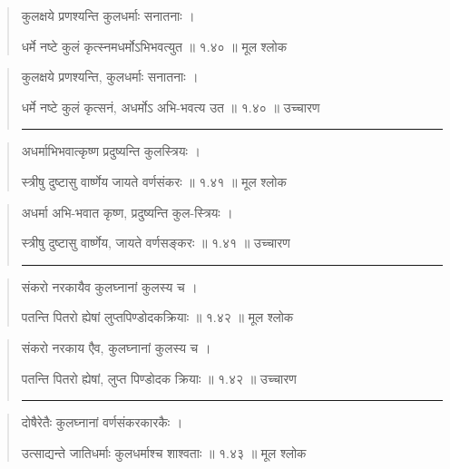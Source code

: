 \begin{quotation} 

कुलक्षये प्रणश्यन्ति कुलधर्माः सनातनाः  ।  


धर्मे नष्टे कुलं कृत्स्नमधर्मोऽभिभवत्युत  ॥ १.४० ॥  मूल श्लोक
\end{quotation}

\begin{quotation}

कुलक्षये प्रणश्यन्ति, कुलधर्माः सनातनाः  ।  


धर्मे नष्टे कुलं कृत्सनं, अधर्मोऽ अभि-भवत्य उत  ॥ १.४० ॥  उच्चारण

\noindent\rule{16cm}{0.4pt} 
\end{quotation}


\begin{quotation} 

अधर्माभिभवात्कृष्ण प्रदुष्यन्ति कुलस्त्रियः  ।  


स्त्रीषु दुष्टासु वार्ष्णेय जायते वर्णसंकरः  ॥ १.४१ ॥  मूल श्लोक
\end{quotation}

\begin{quotation}

अधर्मा अभि-भवात कृष्ण, प्रदुष्यन्ति कुल-स्त्रियः  ।  


स्त्रीषु दुष्टासु वार्ष्णेय, जायते वर्णसङ्करः  ॥ १.४१ ॥  उच्चारण

\noindent\rule{16cm}{0.4pt} 
\end{quotation}


\begin{quotation} 

संकरो नरकायैव कुलघ्नानां कुलस्य च  ।  


पतन्ति पितरो ह्येषां लुप्तपिण्डोदकक्रियाः  ॥ १.४२ ॥  मूल श्लोक
\end{quotation}

\begin{quotation}

संकरो नरकाय एैव, कुलघ्नानां कुलस्य च  ।  


पतन्ति पितरो ह्येषां, लुप्त पिण्डोदक क्रियाः  ॥ १.४२ ॥  उच्चारण

\noindent\rule{16cm}{0.4pt} 
\end{quotation}


\begin{quotation} 

दोषैरेतैः कुलघ्नानां वर्णसंकरकारकैः  ।  


उत्साद्यन्ते जातिधर्माः कुलधर्माश्च शाश्वताः  ॥ १.४३ ॥  मूल श्लोक
\end{quotation}

